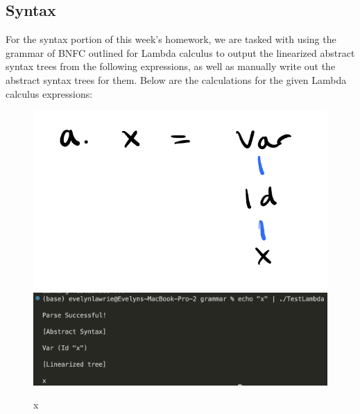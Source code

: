 \documentclass{article}
\theoremstyle{theorem}
\theoremstyle{definition}
\theoremstyle{remark}
\begin{document}
\subsection{Syntax}

For the syntax portion of this week's homework, we are tasked with using the grammar of BNFC outlined for Lambda calculus to output the linearized abstract syntax trees from the following expressions, as well as manually write out the abstract syntax trees for them. Below are the calculations for the given Lambda calculus expressions: 

\begin{figure}[H]
\begin{center}
\includegraphics[scale=0.4]{img/aAST.png}
\\
\includegraphics[scale=0.4]{img/ASTa.png}
\end{center}
\caption{x}\label{ASTa}
\end{figure}
\end{document}
